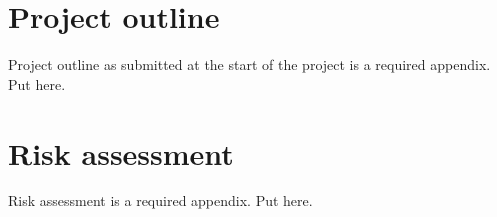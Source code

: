     \begin{uomappendix} 
      \section{Project outline}
      Project outline as submitted at the start of the project is a required appendix. Put here. 
      
      \section{Risk assessment}
      Risk assessment is a required appendix. Put here.
      
    \end{uomappendix}
    
    
    